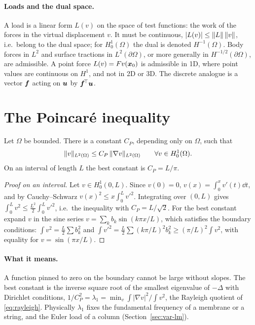 \paragraph{Loads and the dual space.}
%
A load is a linear form $L(v)$ on the space of test functions: the work of
the forces in the virtual displacement $v$. It must be continuous,
$|L(v)|\le\lVert L\rVert\,\lVert v\rVert$, i.e.\ belong to the dual space; for
$H^1_0(\Omega)$ the dual is denoted $H^{-1}(\Omega)$. Body forces in $L^2$ and
surface tractions in $L^2(\partial\Omega)$, or more generally in
$H^{-1/2}(\partial\Omega)$, are admissible. A point force $L(v)=Fv(\bm{x}_0)$ is
admissible in 1D, where point values are continuous on $H^1$, and not in 2D
or 3D. The discrete analogue is a vector $\bm{f}$ acting on $\bm{u}$ by $\bm{f}^{\!\top}\bm{u}$.

\section{The Poincar\'e inequality}\label{sec:sp-poincare}
%
\begin{theorem}[Poincar\'e]\label{thm:poincare}
Let $\Omega$ be bounded. There is a constant $C_P$, depending only on $\Omega$,
such that
\[
  \lVert v\rVert_{L^2(\Omega)}\le C_P\,\lVert \nabla v\rVert_{L^2(\Omega)}\qquad\forall v\in H^1_0(\Omega).
\]
On an interval of length $L$ the best constant is $C_P=L/\pi$.
\end{theorem}
\begin{proof}[Proof on an interval]
Let $v\in H^1_0(0,L)$. Since $v(0)=0$,
$\displaystyle v(x)=\int_0^xv'(t)\dd t$, and by Cauchy--Schwarz
$\displaystyle v(x)^2\le x\int_0^Lv'^2$. Integrating over $(0,L)$ gives
$\displaystyle \int_0^Lv^2\le\frac{L^2}{2}\int_0^Lv'^2$, i.e.\ the inequality with
$C_P=L/\sqrt2$. For the best constant expand $v$ in the sine series
$v=\sum_kb_k\sin(k\pi x/L)$, which satisfies the boundary conditions:
$\displaystyle \int v^2=\frac L2\sum b_k^2$ and
$\displaystyle \int v'^2=\frac L2\sum(k\pi/L)^2b_k^2\ge(\pi/L)^2\int v^2$, with equality
for $v=\sin(\pi x/L)$.
\end{proof}

\paragraph{What it means.} A function pinned to zero on the boundary cannot be
large without slopes. The best constant is the inverse square root of the
smallest eigenvalue of $-\Delta$ with Dirichlet conditions,
$\displaystyle 1/C_P^2=\lambda_1=\min_v\int|\nabla v|^2/\int v^2$, the Rayleigh quotient of
\eqref{eq:rayleigh}. Physically $\lambda_1$ fixes the fundamental frequency of
a membrane or a string, and the Euler load of a column
(Section~\ref{sec:var-lm}).

